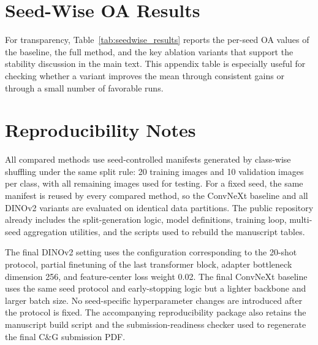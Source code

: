 \section{Seed-Wise OA Results}
\label{sec:appendix_seedwise}

For transparency, Table~\ref{tab:seedwise_results} reports the per-seed OA values of the baseline, the full method, and the key ablation variants that support the stability discussion in the main text. This appendix table is especially useful for checking whether a variant improves the mean through consistent gains or through a small number of favorable runs.



\section{Reproducibility Notes}
\label{sec:appendix_reproducibility}

All compared methods use seed-controlled manifests generated by class-wise shuffling under the same split rule: 20 training images and 10 validation images per class, with all remaining images used for testing. For a fixed seed, the same manifest is reused by every compared method, so the ConvNeXt baseline and all DINOv2 variants are evaluated on identical data partitions. The public repository already includes the split-generation logic, model definitions, training loop, multi-seed aggregation utilities, and the scripts used to rebuild the manuscript tables.

The final DINOv2 setting uses the configuration corresponding to the 20-shot protocol, partial finetuning of the last transformer block, adapter bottleneck dimension 256, and feature-center loss weight 0.02. The final ConvNeXt baseline uses the same seed protocol and early-stopping logic but a lighter backbone and larger batch size. No seed-specific hyperparameter changes are introduced after the protocol is fixed. The accompanying reproducibility package also retains the manuscript build script and the submission-readiness checker used to regenerate the final C\&G submission PDF.

